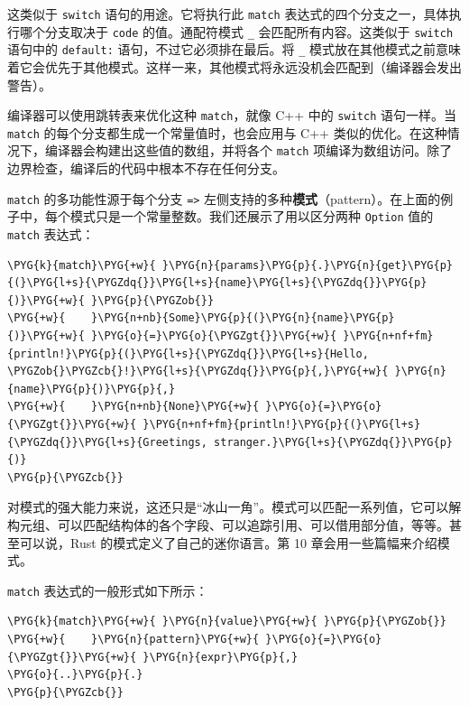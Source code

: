 这类似于 \texttt{switch} 语句的用途。它将执行此 \texttt{match} 表达式的四个分支之一，具体执行哪个分支取决于 \texttt{code} 的值。通配符模式 \texttt{\_} 会匹配所有内容。这类似于 \texttt{switch} 语句中的 \texttt{default:} 语句，不过它必须排在最后。将 \texttt{\_} 模式放在其他模式之前意味着它会优先于其他模式。这样一来，其他模式将永远没机会匹配到（编译器会发出警告）。

编译器可以使用跳转表来优化这种 \texttt{match}，就像 C++ 中的 \texttt{switch} 语句一样。当 \texttt{match} 的每个分支都生成一个常量值时，也会应用与 C++ 类似的优化。在这种情况下，编译器会构建出这些值的数组，并将各个 \texttt{match} 项编译为数组访问。除了边界检查，编译后的代码中根本不存在任何分支。

\texttt{match} 的多功能性源于每个分支 \texttt{=>} 左侧支持的多种\textbf{模式}（pattern）。在上面的例子中，每个模式只是一个常量整数。我们还展示了用以区分两种 \texttt{Option} 值的 \texttt{match} 表达式：

\begin{Verbatim}[commandchars=\\\{\},breaklines=true,breakanywhere=true,fontsize=\codefont,xleftmargin=17bp]
\PYG{k}{match}\PYG{+w}{ }\PYG{n}{params}\PYG{p}{.}\PYG{n}{get}\PYG{p}{(}\PYG{l+s}{\PYGZdq{}}\PYG{l+s}{name}\PYG{l+s}{\PYGZdq{}}\PYG{p}{)}\PYG{+w}{ }\PYG{p}{\PYGZob{}}
\PYG{+w}{    }\PYG{n+nb}{Some}\PYG{p}{(}\PYG{n}{name}\PYG{p}{)}\PYG{+w}{ }\PYG{o}{=}\PYG{o}{\PYGZgt{}}\PYG{+w}{ }\PYG{n+nf+fm}{println!}\PYG{p}{(}\PYG{l+s}{\PYGZdq{}}\PYG{l+s}{Hello, \PYGZob{}\PYGZcb{}!}\PYG{l+s}{\PYGZdq{}}\PYG{p}{,}\PYG{+w}{ }\PYG{n}{name}\PYG{p}{)}\PYG{p}{,}
\PYG{+w}{    }\PYG{n+nb}{None}\PYG{+w}{ }\PYG{o}{=}\PYG{o}{\PYGZgt{}}\PYG{+w}{ }\PYG{n+nf+fm}{println!}\PYG{p}{(}\PYG{l+s}{\PYGZdq{}}\PYG{l+s}{Greetings, stranger.}\PYG{l+s}{\PYGZdq{}}\PYG{p}{)}
\PYG{p}{\PYGZcb{}}
\end{Verbatim}

对模式的强大能力来说，这还只是“冰山一角”。模式可以匹配一系列值，它可以解构元组、可以匹配结构体的各个字段、可以追踪引用、可以借用部分值，等等。甚至可以说，Rust 的模式定义了自己的迷你语言。第 10 章会用一些篇幅来介绍模式。

\texttt{match} 表达式的一般形式如下所示：

\begin{Verbatim}[commandchars=\\\{\},breaklines=true,breakanywhere=true,fontsize=\codefont,xleftmargin=17bp]
\PYG{k}{match}\PYG{+w}{ }\PYG{n}{value}\PYG{+w}{ }\PYG{p}{\PYGZob{}}
\PYG{+w}{    }\PYG{n}{pattern}\PYG{+w}{ }\PYG{o}{=}\PYG{o}{\PYGZgt{}}\PYG{+w}{ }\PYG{n}{expr}\PYG{p}{,}
\PYG{o}{..}\PYG{p}{.}
\PYG{p}{\PYGZcb{}}
\end{Verbatim}

